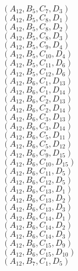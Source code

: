 \documentclass[14pt]{article}
\begin{document}
    $({A}_{12}, {B}_{5}, {C}_{7}, {D}_{3}) $ \\ 
    $({A}_{12}, {B}_{5}, {C}_{8}, {D}_{1}) $ \\ 
    $({A}_{12}, {B}_{5}, {C}_{8}, {D}_{2}) $ \\ 
    $({A}_{12}, {B}_{5}, {C}_{8}, {D}_{3}) $ \\ 
    $({A}_{12}, {B}_{5}, {C}_{9}, {D}_{4}) $ \\ 
    $({A}_{12}, {B}_{5}, {C}_{10}, {D}_{4}) $ \\ 
    $({A}_{12}, {B}_{5}, {C}_{11}, {D}_{6}) $ \\ 
    $({A}_{12}, {B}_{5}, {C}_{12}, {D}_{6}) $ \\ 
    $({A}_{12}, {B}_{6}, {C}_{1}, {D}_{13}) $ \\ 
    $({A}_{12}, {B}_{6}, {C}_{1}, {D}_{14}) $ \\ 
    $({A}_{12}, {B}_{6}, {C}_{2}, {D}_{13}) $ \\ 
    $({A}_{12}, {B}_{6}, {C}_{2}, {D}_{14}) $ \\ 
    $({A}_{12}, {B}_{6}, {C}_{3}, {D}_{13}) $ \\ 
    $({A}_{12}, {B}_{6}, {C}_{3}, {D}_{14}) $ \\ 
    $({A}_{12}, {B}_{6}, {C}_{5}, {D}_{11}) $ \\ 
    $({A}_{12}, {B}_{6}, {C}_{5}, {D}_{12}) $ \\ 
    $({A}_{12}, {B}_{6}, {C}_{9}, {D}_{15}) $ \\ 
    $({A}_{12}, {B}_{6}, {C}_{10}, {D}_{15}) $ \\ 
    $({A}_{12}, {B}_{6}, {C}_{11}, {D}_{5}) $ \\ 
    $({A}_{12}, {B}_{6}, {C}_{12}, {D}_{5}) $ \\ 
    $({A}_{12}, {B}_{6}, {C}_{13}, {D}_{1}) $ \\ 
    $({A}_{12}, {B}_{6}, {C}_{13}, {D}_{2}) $ \\ 
    $({A}_{12}, {B}_{6}, {C}_{13}, {D}_{3}) $ \\ 
    $({A}_{12}, {B}_{6}, {C}_{14}, {D}_{1}) $ \\ 
    $({A}_{12}, {B}_{6}, {C}_{14}, {D}_{2}) $ \\ 
    $({A}_{12}, {B}_{6}, {C}_{14}, {D}_{3}) $ \\ 
    $({A}_{12}, {B}_{6}, {C}_{15}, {D}_{9}) $ \\ 
    $({A}_{12}, {B}_{6}, {C}_{15}, {D}_{10}) $ \\ 
    $({A}_{12}, {B}_{7}, {C}_{1}, {D}_{5}) $ \\ 
\end{document}
